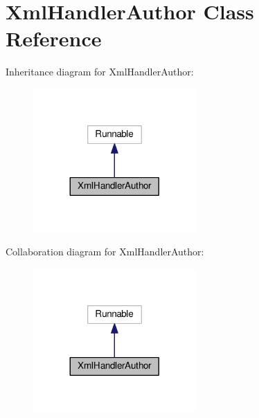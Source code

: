 \hypertarget{classXmlHandlerAuthor}{\section{Xml\-Handler\-Author Class Reference}
\label{classXmlHandlerAuthor}
}


Inheritance diagram for Xml\-Handler\-Author\-:
\nopagebreak
\begin{figure}[H]
\begin{center}
\leavevmode
\includegraphics[width=176pt]{classXmlHandlerAuthor__inherit__graph}
\end{center}
\end{figure}


Collaboration diagram for Xml\-Handler\-Author\-:
\nopagebreak
\begin{figure}[H]
\begin{center}
\leavevmode
\includegraphics[width=176pt]{classXmlHandlerAuthor__coll__graph}
\end{center}
\end{figure}
